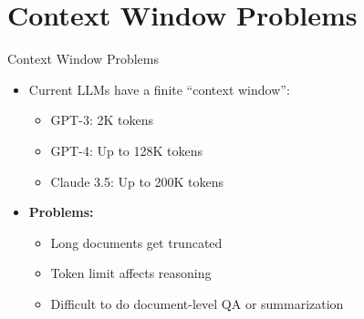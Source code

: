 \section{Context Window Problems}
\begin{frame}{Context Window Problems}
    \begin{itemize}
        \item Current LLMs have a finite ``context window'':
        \begin{itemize}
            \item GPT-3: 2K tokens
            \item GPT-4: Up to 128K tokens
            \item Claude 3.5: Up to 200K tokens
        \end{itemize}
        \item \textbf{Problems:}
        \begin{itemize}
            \item Long documents get truncated
            \item Token limit affects reasoning
            \item Difficult to do document-level QA or summarization
        \end{itemize}
    \end{itemize}
\end{frame}